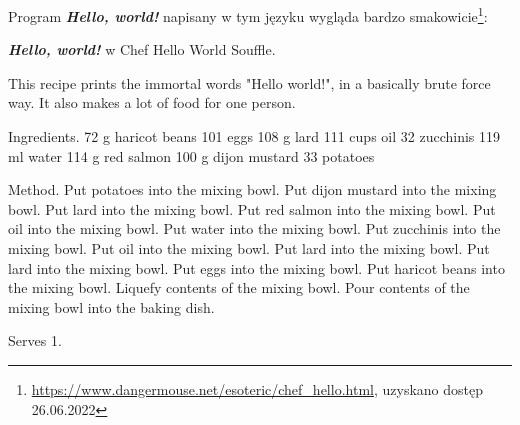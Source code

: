 \documentclass[fleqn,10pt]{SelfArx} %
\begin{document}
Program \textbf{\textit{Hello, world!}} napisany w tym języku wygląda bardzo smakowicie\footnote{\url{https://www.dangermouse.net/esoteric/chef_hello.html}, uzyskano dostęp 26.06.2022}:
\begin{sexylisting}{\textbf{\textit{Hello, world!}} w Chef}
Hello World Souffle.

This recipe prints the immortal words "Hello world!", in a basically brute force way. It also makes a lot of food for one person.

Ingredients.
72 g haricot beans
101 eggs
108 g lard
111 cups oil
32 zucchinis
119 ml water
114 g red salmon
100 g dijon mustard
33 potatoes

Method.
Put potatoes into the mixing bowl. Put dijon mustard into the mixing bowl. Put lard into the mixing bowl. Put red salmon into the mixing bowl. Put oil into the mixing bowl. Put water into the mixing bowl. Put zucchinis into the mixing bowl. Put oil into the mixing bowl. Put lard into the mixing bowl. Put lard into the mixing bowl. Put eggs into the mixing bowl. Put haricot beans into the mixing bowl. Liquefy contents of the mixing bowl. Pour contents of the mixing bowl into the baking dish.

Serves 1.
\end{sexylisting}
\end{document}
